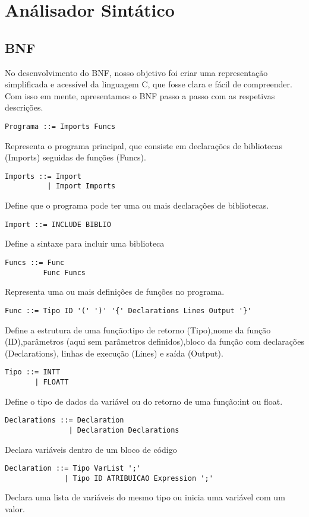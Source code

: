 \documentclass[12pt,a4paper]{report}
\begin{document}
\chapter{An\'{a}lisador Sint\'{a}tico}
\section{BNF}
No desenvolvimento do BNF, nosso objetivo foi criar uma representação simplificada e acessível da linguagem C, que fosse clara e fácil de compreender. Com isso em mente, apresentamos o BNF passo a passo com as respetivas descrições.
\begin{lstlisting}
Programa ::= Imports Funcs
\end{lstlisting}
Representa o programa principal, que consiste em declarações de bibliotecas (Imports) seguidas de funções (Funcs).
\begin{lstlisting}
Imports ::= Import
          | Import Imports 
\end{lstlisting}
Define que o programa pode ter uma ou mais declarações de bibliotecas.
\begin{lstlisting}
Import ::= INCLUDE BIBLIO  
\end{lstlisting}
Define a sintaxe para incluir uma biblioteca
\begin{lstlisting}
Funcs ::= Func
         Func Funcs
\end{lstlisting}
Representa uma ou mais definições de funções no programa.
\begin{lstlisting}
Func ::= Tipo ID '(' ')' '{' Declarations Lines Output '}'
\end{lstlisting}
Define a estrutura de uma função:tipo de retorno (Tipo),nome da função (ID),parâmetros (aqui sem parâmetros definidos),bloco da função com declarações (Declarations), linhas de execução (Lines) e saída (Output).
\begin{lstlisting}
Tipo ::= INTT
       | FLOATT
\end{lstlisting}
Define o tipo de dados da variável ou do retorno de uma função:int ou float.
\begin{lstlisting}
Declarations ::= Declaration
               | Declaration Declarations
\end{lstlisting}
Declara variáveis dentro de um bloco de código
\begin{lstlisting}
Declaration ::= Tipo VarList ';'
              | Tipo ID ATRIBUICAO Expression ';'
\end{lstlisting}
Declara uma lista de variáveis do mesmo tipo ou inicia uma variável com um valor.
\end{document}

